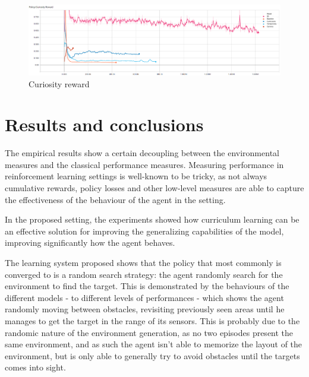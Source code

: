 \documentclass{ifacconf}
\begin{document}
\begin{figure}[!htb]
\begin{center}
\includegraphics[width=\linewidth]{res/curiosity_reward.PNG} 
\caption{Curiosity reward} 
\label{fig:currew}
\end{center}
\end{figure}

\section{Results and conclusions}

The empirical results show a certain decoupling between the environmental measures and the classical performance measures. Measuring performance in reinforcement learning settings is well-known to be tricky, as not always cumulative rewards, policy losses and other low-level measures are able to capture the effectiveness of the behaviour of the agent in the setting.

In the proposed setting, the experiments showed how curriculum learning can be an effective solution for improving the generalizing capabilities of the model, improving significantly how the agent behaves.

The learning system proposed shows that the policy that most commonly is converged to is a random search strategy: the agent randomly search for the environment to find the target. This is demonstrated by the behaviours of the different models - to different levels of performances - which shows the agent randomly moving between obstacles, revisiting previously seen areas until he manages to get the target in the range of its sensors. This is probably due to the randomic nature of the environment generation, as no two episodes present the same environment, and as such the agent isn't able to memorize the layout of the environment, but is only able to generally try to avoid obstacles until the targets comes into sight. 
\end{document}
